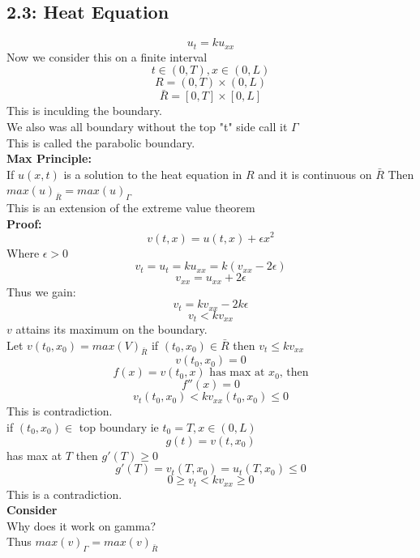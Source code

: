 \documentclass{article}
\begin{document}
\subsection{2.3: Heat Equation}
$$ u_t = k u_{xx}$$
Now we consider this on a finite interval \\
$$t \in (0,T), x \in (0,L)$$
$$ R = (0,T) \times (0,L)$$
$$ \bar{R} = [0,T] \times [0,L]$$
This is inculding the boundary.\\
We also was all boundary without the top "t" side call it $\Gamma$\\
This is called the parabolic boundary.\\
\textbf{Max Principle:}\\
If $u(x,t)$ is a solution to the heat equation in $R$ and it is continuous on $\bar{R}$ 
Then $max(u)_{\bar{R}} = max(u)_{\Gamma}$\\
This is an extension of the extreme value theorem\\
\textbf{Proof:}\\
$$v(t,x) = u(t,x) + \epsilon x^2$$
Where $\epsilon > 0$\\
$$v_t = u_t = k u_{xx} = k( v_{xx} - 2\epsilon)$$
$$v_{xx} = u_{xx} + 2\epsilon$$
Thus we gain:
$$ v_t = k v_{xx} - 2k\epsilon$$
$$ v_t < k v_{xx}$$
$v$ attains its maximum on the boundary.\\
Let $v(t_0,x_0) = max(V)_{\bar{R}}$
if $(t_0,x_0) \in \bar{R}$ then $v_t \leq k v_{xx}$\\
$$ v(t_0,x_0) = 0 $$
$$ f(x) = v(t_0,x) \text{ has max at } x_0 \text{, then}$$
$$ f''(x) = 0 $$
$$ v_t(t_0,x_0) < k v_{xx}(t_0,x_0) \leq 0$$
This is contradiction.\\
if $(t_0,x_0) \in $ top boundary ie $t_0 = T, x \in (0,L)$\\
$$ g(t) = v(t,x_0) $$
has max at $T$ then $g'(T) \geq 0$\\
$$ g'(T) = v_t(T,x_0) = u_t(T,x_0) \leq 0$$
$$ 0 \geq v_t < k v_{xx} \geq 0$$
This is a contradiction.\\
\textbf{Consider} \\
Why does it work on gamma?\\
Thus $max(v)_\Gamma = max(v)_{\bar{R}}$\\
\end{document}
